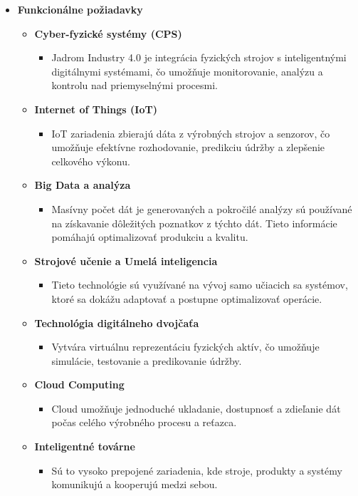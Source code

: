 \begin{itemize}
   \item \textbf{Funkcionálne požiadavky}
   
   \begin{itemize}
     \item \textbf{Cyber-fyzické systémy (CPS)}
        \begin{itemize}
            \item Jadrom Industry 4.0 je integrácia fyzických strojov s inteligentnými digitálnymi systémami, čo umožňuje monitorovanie, analýzu a kontrolu nad priemyselnými procesmi.
        \end{itemize}
     \item \textbf{Internet of Things (IoT)}
        \begin{itemize}
            \item IoT zariadenia zbierajú dáta z výrobných strojov a senzorov, čo umožňuje efektívne rozhodovanie, predikciu údržby a zlepšenie celkového výkonu.
        \end{itemize}
     \item \textbf{Big Data a analýza}
        \begin{itemize}
            \item Masívny počet dát je generovaných a pokročilé analýzy sú používané na získavanie dôležitých poznatkov z týchto dát. Tieto informácie pomáhajú optimalizovať produkciu a kvalitu.
        \end{itemize}
     \item \textbf{Strojové učenie a Umelá inteligencia}
        \begin{itemize}
            \item Tieto technológie sú využívané na vývoj samo učiacich sa systémov, ktoré sa dokážu adaptovať a postupne optimalizovať operácie.
        \end{itemize}
     \item \textbf{Technológia digitálneho dvojčaťa}
        \begin{itemize}
            \item Vytvára virtuálnu reprezentáciu fyzických aktív, čo umožňuje simulácie, testovanie a predikovanie údržby.
        \end{itemize}
     \item \textbf{Cloud Computing}
        \begin{itemize}
            \item Cloud umožňuje jednoduché ukladanie, dostupnosť a zdieľanie dát počas celého výrobného procesu a reťazca.
        \end{itemize}
     \item \textbf{Inteligentné továrne}
        \begin{itemize}
            \item Sú to vysoko prepojené zariadenia, kde stroje, produkty a systémy komunikujú a kooperujú medzi sebou.
        \end{itemize}
   \end{itemize}
\end{itemize}

